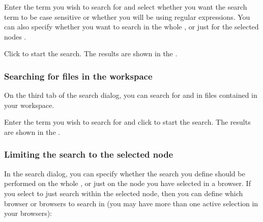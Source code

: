 Enter the term you wish to search for and select whether you want the search term to be case sensitive or whether you will be using regular expressions. You can also specify whether you want to search in the whole \gdproject{}, or just for the selected nodes .

Click  to start the search. The results are shown in the \gdsearchresultview{} . 


\subsubsection{Searching for files in the workspace}
\label{TasksSearchFiles}

On the third tab of the search dialog, you can search for and in files contained in your workspace.

Enter the term you wish to search for and click  to start the search. The results are shown in the \gdsearchresultview{} . 

\subsubsection{Limiting the search to the selected node}
\label{TasksSearchLimit}

In the search dialog, you can specify whether the search you define should be performed on the whole \gdproject{}, or just on the node you have selected in a browser. If you select to just search within the selected node, then you can define which browser or browsers to search in (you may have more than one active selection in your browsers):

